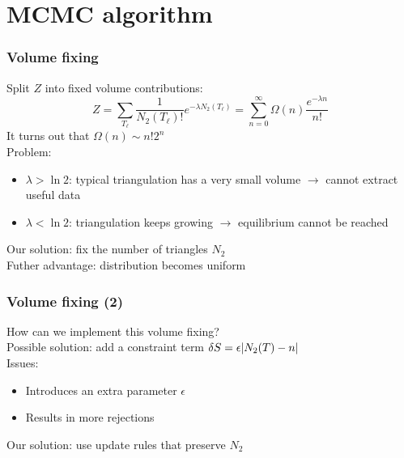 \documentclass{beamer}
\begin{document}
\section{MCMC algorithm}

\begin{frame}
    \frametitle{Volume fixing}
    Split $Z$ into fixed volume contributions:
    \begin{equation}
        Z
        =
        \sum_{T_\ell} \frac{1}{N_2(T_\ell)!} e^{-\lambda N_2(T_\ell)}
        =
        \sum_{n = 0}^\infty \Omega(n) \frac{e^{-\lambda n}}{n!}
    \end{equation}
    It turns out that $\Omega(n) \sim n! 2^n$ \\
    Problem:
    \begin{itemize}
        \item $\lambda > \ln 2$: typical triangulation has a very small volume $\to$ cannot extract useful data
        \item $\lambda < \ln 2$: triangulation keeps growing $\to$ equilibrium cannot be reached
    \end{itemize}
    Our solution: fix the number of triangles $N_2$ \\
    Futher advantage: distribution becomes uniform
\end{frame}

\begin{frame}
    \frametitle{Volume fixing (2)}
    How can we implement this volume fixing? \\
    Possible solution: add a constraint term $\delta S = \epsilon \abs{N_2(T) - n}$ \\
    Issues:
    \begin{itemize}
        \item Introduces an extra parameter $\epsilon$
        \item Results in more rejections
    \end{itemize}
    Our solution: use update rules that preserve $N_2$
\end{frame}
\end{document}
